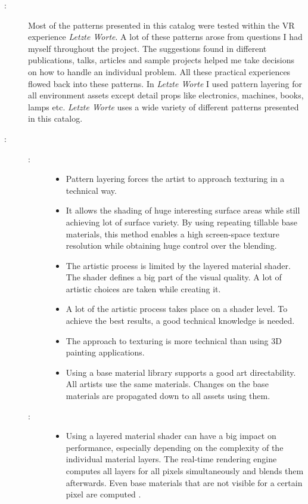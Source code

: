 \begin{description}
	\item[\patExamples:] Most of the patterns presented in this catalog were tested within the VR experience \emph{Letzte Worte}. A lot of these patterns arose from questions I had myself throughout the project. The suggestions found in different publications, talks, articles and sample projects helped me take decisions on how to handle an individual problem. All these practical experiences flowed back into these patterns. In \emph{Letzte Worte} I used pattern layering for all environment assets except detail props like electronics, machines, books, lamps etc. \emph{Letzte Worte} uses a wide variety of different patterns presented in this catalog.  
	\item[\patConsequences:]\hfill 
		\begin{description}
			\item[\visual:]\hfill
			\begin{itemize}\mynobreakpar
				\item Pattern layering forces the artist to approach texturing in a technical way. 
				\item It allows the shading of huge interesting surface areas while still achieving lot of surface variety. By using repeating tillable base materials, this method enables a high screen-space texture resolution  while obtaining huge control over the blending. 
				\item The artistic process is limited by the layered material shader. The shader defines a big part of the visual quality. A lot of artistic choices are taken while creating it.
				\item A lot of the artistic process takes place on a shader level. To achieve the best results, a good technical knowledge is needed.
				\item The approach to texturing is more technical than using 3D painting applications. 
				\item Using a base material library supports a good art directability. All artists use the same materials. Changes on the base materials are propagated down to all assets using them. 
			\end{itemize}%
			\item[\performance:]\hfill
			\begin{itemize}\mynobreakpar
				\item Using a layered material shader can have a big impact on performance, especially depending on the complexity of the individual material layers. The real-time rendering engine computes all layers for all pixels simultaneously and blends them afterwards. Even base materials that are not visible for a certain pixel are computed \cite{epic2015LayeredMats}. 

\end{itemize}
\end{description}
\end{description}

